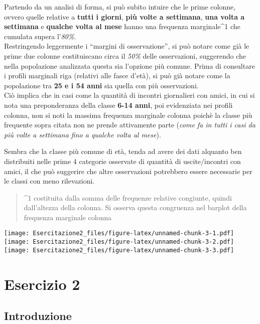 \documentclass[
]{article}
\begin{document}
Partendo da un analisi di forma, si può subito intuire che le prime
colonne, ovvero quelle relative a \textbf{tutti i giorni}, \textbf{più
volte a settimana}, \textbf{una volta a settimana} e \textbf{qualche
volta al mese} hanno una frequenza marginale\^{}1 che cumulata supera
l'\emph{80\%}.\\
Restringendo leggermente i ``margini di osservazione'', si può notare
come già le prime due colonne costituiscano circa il \emph{50\%} delle
osservazioni, suggerendo che nella popolazione analizzata questa sia
l'opzione più comune. Prima di consultare i profili marginali riga
(relativi alle fasce d'età), si può già notare come la popolazione tra
\textbf{25 e i 54 anni} sia quella con più osservazioni.\\
Ciò implica che in casi come la quantità di incontri giornalieri con
amici, in cui si nota una preponderanza della classe \textbf{6-14 anni},
poi evidenziata nei profili colonna, non si noti la massima frequenza
marginale colonna poichè la classe più frequente sopra citata non ne
prende attivamente parte (\emph{come fa in tutti i casi da più volte a
settimana fino a qualche volta al mese}).

Sembra che la classe più comune di età, tenda ad avere dei dati alquanto
ben distribuiti nelle prime 4 categorie osservate di quantità di
uscite/incontri con amici, il che può suggerire che altre osservazioni
potrebbero essere necessarie per le classi con meno rilevazioni.

\begin{quote}
\^{}1 costituita dalla somma delle frequenze relative congiunte, quindi
dall'altezza della colonna. Si osserva questa congruenza nel barplot
della frequenza marginale colonna
\end{quote}

\texttt{[image: Esercitazione2\_files/figure-latex/unnamed-chunk-3-1.pdf]}
\texttt{[image: Esercitazione2\_files/figure-latex/unnamed-chunk-3-2.pdf]}
\texttt{[image: Esercitazione2\_files/figure-latex/unnamed-chunk-3-3.pdf]}

\hypertarget{esercizio-2}{%
\section{Esercizio 2}\label{esercizio-2}}

\hypertarget{introduzione-1}{%
\subsection{Introduzione}\label{introduzione-1}}
\end{document}
